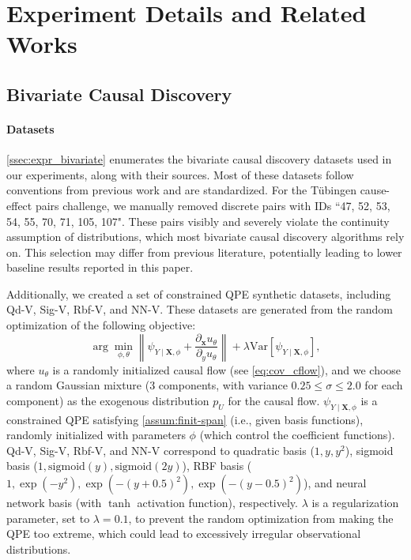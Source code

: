\documentclass{article}
\theoremstyle{plain}
\theoremstyle{definition}
\theoremstyle{remark}
\begin{document}
\newpage
\section{Experiment Details and Related Works}

\subsection{Bivariate Causal Discovery}
\label{app:c_bivariate}

\paragraph{Datasets}

\cref{ssec:expr_bivariate} enumerates the bivariate causal discovery datasets used in our experiments, along with their sources. Most of these datasets follow conventions from previous work \citep{Immer2023, Xi2025} and are standardized. For the Tübingen cause-effect pairs challenge, we manually removed discrete pairs with IDs ``47, 52, 53, 54, 55, 70, 71, 105, 107". These pairs visibly and severely violate the continuity assumption of distributions, which most bivariate causal discovery algorithms rely on. This selection may differ from previous literature, potentially leading to lower baseline results reported in this paper.

Additionally, we created a set of constrained QPE synthetic datasets, including Qd-V, Sig-V, Rbf-V, and NN-V. These datasets are generated from the random optimization of the following objective:
\[\arg\min_{\phi,\theta}\left\|\psi_{Y\mid\bm{X},\phi}+\frac{\partial_{\bm{x}}u_\theta}{\partial_{y}u_{\theta}}\right\|+\lambda\text{Var}\left[\psi_{Y\mid\bm{X},\phi}\right],\]
where $u_\theta$ is a randomly initialized causal flow (see \cref{eq:cov_cflow}), and we choose a random Gaussian mixture (3 components, with variance $0.25\le\sigma\le2.0$ for each component) as the exogenous distribution $p_U$ for the causal flow. $\psi_{Y\mid\bm{X},\phi}$ is a constrained QPE satisfying \cref{assum:finit-span} (i.e., given basis functions), randomly initialized with parameters $\phi$ (which control the coefficient functions). Qd-V, Sig-V, Rbf-V, and NN-V correspond to quadratic basis ($1,y,y^2$), sigmoid basis ($1,\text{sigmoid}(y),\text{sigmoid}(2y)$), RBF basis ($1,\exp(-y^2),\exp(-(y+0.5)^2),\exp(-(y-0.5)^2)$), and neural network basis (with $\tanh$ activation function), respectively. $\lambda$ is a regularization parameter, set to $\lambda=0.1$, to prevent the random optimization from making the QPE too extreme, which could lead to excessively irregular observational distributions.
\end{document}
